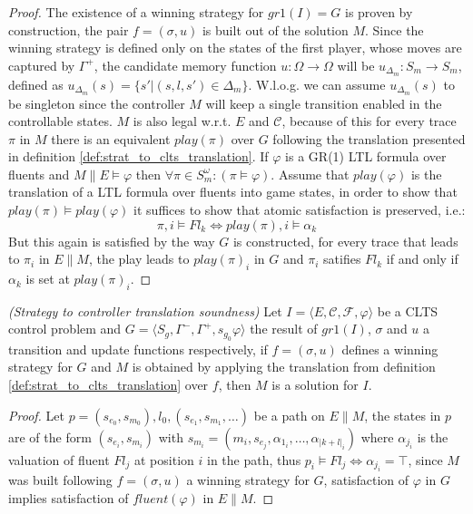 \begin{proof}\label{def:strat_completeness_proof}
	The existence of a winning strategy for $gr1(I)=G$ is proven by construction, the pair
	$f=(\sigma, u)$ is built out of the solution $M$. Since the winning strategy is defined only on the
	states of the first player, whose moves are captured by $\Gamma^{+}$, the candidate memory
	function $u:\Omega \rightarrow \Omega$ will be $u_{\Delta_m}:S_m \rightarrow S_m$, defined 
	as $u_{\Delta_m}(s)=\{ s'|(s,l,s')\in \Delta_m\}$. W.l.o.g. we can assume $u_{\Delta_m}(s)$ to be singleton since the controller $M$ will keep a single transition enabled in the controllable states. 
	$M$ is also legal w.r.t. $E$ and $\mathcal{C}$, because of this
	for every trace $\pi$ in $M$ there is an equivalent $play(\pi)$ over $G$ following the translation presented in definition \ref{def:strat_to_clts_translation}.	
	If $\varphi$ is a GR(1) LTL formula over fluents and $M \parallel E \models \varphi$ then $\forall \pi \in S_m^{\omega}:(\pi \models \varphi)$. Assume that $play(\varphi)$ is the translation of a LTL formula over fluents into game states, in order to show that $play(\pi) \models play(\varphi)$ it suffices to show that atomic satisfaction is preserved, i.e.: 
	\[\pi,i \models Fl_k \iff play(\pi),i \models \alpha_k \]
	But this again is satisfied by the way $G$ is constructed, for every trace that leads to $\pi_i$ in $E \parallel M$, the play leads to $play(\pi)_i$ in $G$ and $\pi_i$ satifies $Fl_k$ if and only if $\alpha_k$ is set at $play(\pi)_i$.	
\end{proof}

\begin{definition}\label{def:strat_soundness} \emph{(Strategy to controller translation soundness)} 
	Let $I = \langle E, \mathcal{C}, \mathcal{F}, \varphi \rangle$ be a CLTS control problem and $G = \langle S_g, \Gamma^-,\Gamma^+,s_{g_0}\varphi \rangle$ the result of $gr1(I)$, $\sigma$ and $u$ a transition and update functions respectively, if $f=(\sigma, u)$ defines a winning strategy for $G$ and $M$ is obtained by applying the translation from definition \ref{def:strat_to_clts_translation} over $f$, then $M$ is a solution for $I$.
\end{definition}

\begin{proof}\label{def:strat_soundness_proof}
	Let $p=(s_{e_0},s_{m_0}),l_0,(s_{e_1},s_{m_1},\ldots)$ be a path on $E \parallel M$, the states in
	$p$ are of the form $(s_{e_i},s_{m_i})$ with $s_{m_i}=(m_i,s_{e_j},\alpha_{1_i},\ldots,\alpha_{|k+l|_i})$ where $\alpha_{j_i}$ is the valuation of fluent $Fl_j$ at position $i$ in the path, thus $p_i \models Fl_j \iff \alpha_{j_i} = \top$, since $M$ was built following $f=(\sigma,u)$ a winning strategy for $G$, satisfaction of $\varphi$ in $G$ implies satisfaction of $fluent(\varphi)$ in $E \parallel M$.
\end{proof}